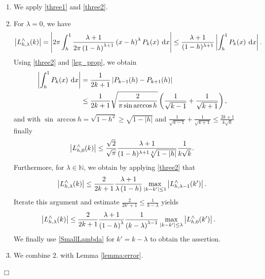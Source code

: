\documentclass[11pt,a4paper,twoside,bibtotoc]{scrartcl}
\theoremstyle{plain}
\theoremstyle{definition}
\theoremstyle{remark}
\newenvironment{proof}{{\bf Proof.}}{$\Box$}
\newcommand{\N}{\ensuremath{\mathbb{N}}}
\newcommand{\abs}[1]{\ensuremath{\left\vert#1\right\vert}}
\newcommand{\fun}[2]{\ensuremath{#1{\hspace{-0.4ex}}\left(#2\right)}}
\newcommand{\paren}[1]{\ensuremath{\left(#1\right)}}
\newcommand{\dx}{\text{\rm{d}}}
\numberwithin{equation}{section}
\numberwithin{table}{section}
\numberwithin{figure}{section}
\begin{document}
\begin{proof}
  \begin{enumerate}
  \item We apply \eqref{three1} and \eqref{three2}.
  \item For $\lambda=0$, we have
    \begin{equation*}
      \left|\fun{L_{h,\lambda}^{\wedge}}{k}\right| 
      = \abs{2\pi \int_{h}^1 \frac{\lambda+1}{2\pi\paren{1-h}^{\lambda+1}} 
        \paren{x-h}^{\lambda} \fun{P_{k}}{x} \: \dx x} 
      \le \frac{\lambda+1}{(1-h)^{\lambda+1}}\abs{\int_{h}^1 \fun{P_{k}}{x} \: \dx x}.
    \end{equation*}
    Using \eqref{three2} and \eqref{leg_prop}, we obtain
    \begin{align*}
      \abs{\int_{h}^1 \fun{P_{k}}{x} \: \dx x}
      & = \frac{1}{2k+1}
          \abs{\fun{P_{k-1}}{h} - \fun{P_{k+1}}{h}}\\
      & \le \frac{1}{2k+1} \sqrt{\frac{2}{\pi \sin\arccos h}} \paren{\frac{1}{\sqrt{k-1}} + \frac{1}{\sqrt{k+1}}},
    \end{align*}
    and with $\sin\arccos h = \sqrt{1-h^2} \ge \sqrt{1-|h|}$ and
    $\frac{1}{\sqrt{k-1}} + \frac{1}{\sqrt{k+1}} \le
    \frac{2k+1}{k\sqrt{k}}$ finally
    \begin{equation}
      \label{SmallLambda}
      \left|\fun{L_{h,0}^{\wedge}}{k}\right| \le 
      \frac{\sqrt{2}}{\sqrt{\pi}}\frac{\lambda+1}{(1-h)^{\lambda+1}\sqrt[4]{1-|h|}}
      \frac{1}{k\sqrt{k}}.
    \end{equation}
    Furthermore, for $\lambda \in \N$, we obtain by applying \eqref{three2} that
    \begin{equation*}
      \left|\fun{L_{h,\lambda}^{\wedge}}{k}\right| 
      \le \frac{2}{2k+1} \frac{\lambda+1}{\lambda\left(1-h\right)}
      \max\limits_{|k-k'|\le 1}
      \left|\fun{L_{h,\lambda-1}^{\wedge}}{k'}\right|.
    \end{equation*}
    Iterate this argument and estimate $\frac{2}{2k'+1}\le
    \frac{1}{k-\lambda}$ yields
    \begin{align*}
      \left|\fun{L_{h,\lambda}^{\wedge}}{k}\right|
      & \le \frac{2}{2k+1} \frac{\lambda+1}{\paren{1-h}^{\lambda}}
        \frac{1}{\paren{k-\lambda}^{\lambda-1}} 
        \max_{|k-k'| \le \lambda} 
        \abs{\fun{L_{h,0}^{\wedge}}{k'}}.
    \end{align*}
    We finally use \eqref{SmallLambda} for $k'=k-\lambda$ to obtain the
    assertion.
  \item We combine 2. with Lemma \ref{lemma:error}. 
  \end{enumerate}
\end{proof}
\end{document}

